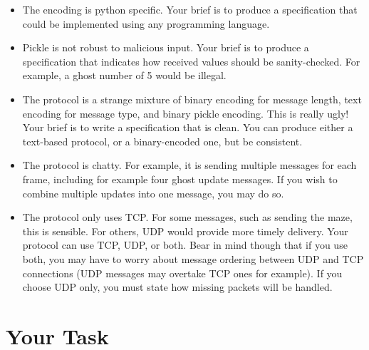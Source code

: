 \documentclass{article}
\begin{document}
\begin{itemize}
\item The encoding is python specific.  Your brief is to produce a specification that could be implemented using any programming language.
\item Pickle is not robust to malicious input.  Your brief is to
  produce a specification that indicates how received values should be
  sanity-checked.  For example, a ghost number of 5 would be illegal.
\item The protocol is a strange mixture of binary encoding for message length, text encoding for message type, and binary pickle encoding.  This is really ugly!  Your brief is to write a specification that is clean.  You can produce either a text-based protocol, or a binary-encoded one, but be consistent.
\item The protocol is chatty.  For example, it is sending multiple
  messages for each frame, including for example four ghost update
  messages.  If you wish to combine multiple updates into one message,
  you may do so.
\item The protocol only uses TCP.  For some messages, such as sending
  the maze, this is sensible.  For others, UDP would provide more
  timely delivery.  Your protocol can use TCP, UDP, or both.  Bear in
  mind though that if you use both, you may have to worry about
  message ordering between UDP and TCP connections (UDP messages may
  overtake TCP ones for example).  If you choose UDP only, you must
  state how missing packets will be handled.
\end{itemize}

\section{Your Task}
\end{document}
